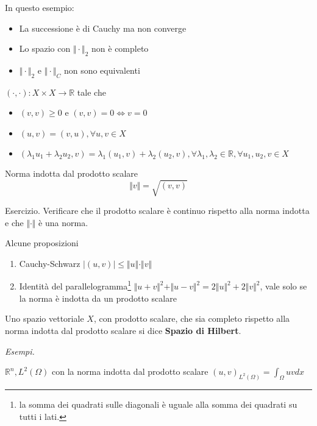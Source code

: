\documentclass[10pt,a4paper,twoside,openright]{book}
\begin{document}
In questo esempio:
\begin{itemize}
	\item La successione è di Cauchy ma non converge
	\item Lo spazio con $\Vert \cdotp \Vert _{2}$ non è completo
	\item $\Vert \cdotp \Vert _{2}$ e $\Vert \cdotp \Vert _{C}$ non sono equivalenti
\end{itemize}
\begin{definition}
	 $(\cdotp,\cdotp) :X\times X\rightarrow \mathbb{R}$ tale che
	\begin{itemize}
		\item $(v,v) \geqslant 0$ e $(v,v) =0\Leftrightarrow v=0$
		\item $(u,v) =(v,u),\forall u,v\in X$
		\item $( \lambda _{1} u_{1} +\lambda _{2} u_{2},v) =\lambda _{1}(u_{1},v) +\lambda _{2}(u_{2},v),\forall \lambda _{1},\lambda _{2} \in \mathbb{R},\forall u_{1},u_{2},v\in X$
	\end{itemize}
\end{definition}
\begin{definition}
	Norma indotta dal prodotto scalare
	\begin{equation*}
		\Vert v\Vert =\sqrt{(v,v)}
	\end{equation*}
\end{definition}
Esercizio. Verificare che il prodotto scalare è continuo rispetto alla norma indotta e che $\Vert \cdotp \Vert $ è una norma.
\begin{theorem}
	Alcune proposizioni
	\begin{enumerate}
		\item Cauchy-Schwarz $| (u,v)| \leqslant \Vert u\Vert \cdotp \Vert v\Vert $
		\item Identità del parallelogramma\footnote{la somma dei quadrati sulle diagonali è uguale alla somma dei quadrati su tutti i lati.} $\Vert u+v\Vert ^{2} +\Vert u-v\Vert ^{2} =2\Vert u\Vert ^{2} +2\Vert v\Vert ^{2}$, vale solo se la norma è indotta da un prodotto scalare
	\end{enumerate}
\end{theorem}
\begin{definition}
	Uno spazio vettoriale $X$, con prodotto scalare, che sia completo rispetto alla norma indotta dal prodotto scalare si dice \textbf{Spazio di Hilbert}.
\end{definition}
\textit{Esempi.}

$\mathbb{R}^{n},L^{2}(\Omega)$ con la norma indotta dal prodotto scalare $(u,v)_{L^{2}(\Omega)} =\int _{\Omega } uvdx$
\end{document}
